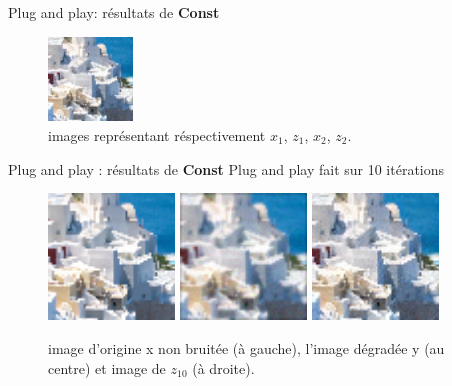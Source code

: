 \documentclass[11pt]{beamer}
\begin{document}
\begin{frame}{Plug and play: résultats de \textbf{Const}}
\begin{figure}[b]
        \includegraphics[width=0.20\textwidth]{../images/hqs_constant/z_1.png}
        \caption{images représentant réspectivement $x_1$, $z_1$, $x_2$, $z_2$.}
    \end{figure}
\end{frame}

\begin{frame}{Plug and play : résultats de \textbf{Const}}
    Plug and play fait sur 10 itérations
    \begin{figure}[b]
        \centering
        \includegraphics[width=0.30\textwidth]{../images/hqs_original/0823.png}
        \includegraphics[width=0.30\textwidth]{../images/hqs_constant/y.png}
        \includegraphics[width=0.30\textwidth]{../images/hqs_constant/z_9.png}
        \caption{image d'origine x non bruitée (à gauche), l'image dégradée y (au centre) et image de $z_{10}$ (à droite).}
    \end{figure}
\end{frame}
\end{document}
